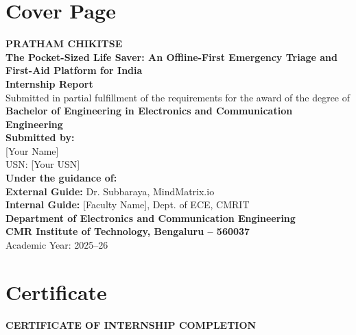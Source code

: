 \documentclass[12pt,a4paper]{report}
\begin{document}
\pagestyle{romanstyle}

\chapter*{Cover Page}
\vspace*{3cm}
\begin{center}
    {\huge \textbf{PRATHAM CHIKITSE}} \\[0.4cm]
    {\Large \textbf{The Pocket-Sized Life Saver: An Offline-First Emergency Triage and First-Aid Platform for India}} \\[2cm]
    {\large \textbf{Internship Report}} \\
    {\normalsize Submitted in partial fulfillment of the requirements for the award of the degree of} \\[0.3cm]
    {\large \textbf{Bachelor of Engineering in Electronics and Communication Engineering}} \\[1.5cm]
    {\normalsize \textbf{Submitted by:}} \\[0.2cm]
    {\large [Your Name]} \\
    {\normalsize USN: [Your USN]} \\[1.5cm]
    {\normalsize \textbf{Under the guidance of:}} \\[0.2cm]
    {\normalsize \textbf{External Guide:} Dr. Subbaraya, MindMatrix.io} \\
    {\normalsize \textbf{Internal Guide:} [Faculty Name], Dept. of ECE, CMRIT} \\[1.5cm]
    {\large \textbf{Department of Electronics and Communication Engineering}} \\
    {\large \textbf{CMR Institute of Technology, Bengaluru -- 560037}} \\[0.5cm]
    {\normalsize Academic Year: 2025--26}
\end{center}
\newpage

\chapter*{Certificate}
\vspace*{1.5cm}
\begin{center}
    {\Large \textbf{CERTIFICATE OF INTERNSHIP COMPLETION}}
\end{center}
\vspace{1cm}
\end{document}
